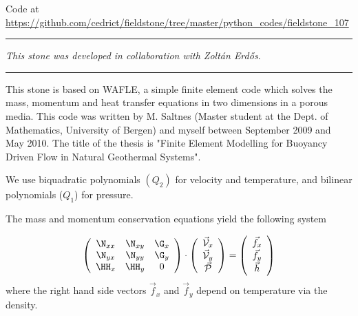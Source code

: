 


\begin{center}
Code at \url{https://github.com/cedrict/fieldstone/tree/master/python_codes/fieldstone_107}
\end{center}

\par\noindent\rule{\textwidth}{0.4pt}

{\sl This stone was developed in collaboration with Zolt{\'a}n Erd{\H{o}}s}. 

\par\noindent\rule{\textwidth}{0.4pt}




This stone is based on WAFLE, a simple finite element code which solves the mass, momentum and heat transfer 
equations in two dimensions in a porous media. This  code was written by M. Saltnes (Master student at 
the Dept. of Mathematics, University of Bergen) and myself between September 2009 and May 2010. The title 
of the thesis is "Finite Element Modelling for Buoyancy Driven Flow in Natural Geothermal Systems". 

\vspace{1cm}

We use biquadratic polynomials $(Q_2)$ for velocity and temperature, 
and bilinear polynomials ($Q_1$) for pressure.

The mass and momentum conservation equations yield the following system 

\[
\left(
\begin{array}{ccc}
\N_{xx} & \N_{xy} & \G_x \\
\N_{yx} & \N_{yy} & \G_y \\
\HH_{x} & \HH_y & 0 
\end{array}
\right)
\cdot
\left(
\begin{array}{c}
\vec{\cal V}_x \\
\vec{\cal V}_y \\ 
\vec{\cal P}
\end{array}
\right)
=
\left(
\begin{array}{c}
\vec{f}_x \\ 
\vec{f}_y \\ 
\vec{h}
\end{array}
\right)
\]
where the right hand side vectors $\vec{f}_x $ and $\vec{f}_y$ depend on temperature via the density. 

